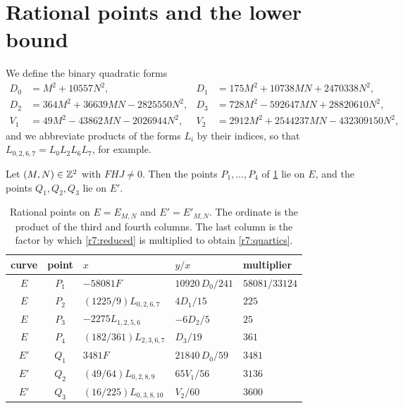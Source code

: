 \section{Rational points and the lower bound}\label{sec:r7-points}

We define the binary quadratic forms
\begin{equation}\label{r7:quadratics}
\begin{aligned}
 D_0&=M^2+10557N^2, & D_1&=175M^2+10738MN+2470338N^2,\\
 D_2&=364M^2+36639MN-2825550N^2, & D_3&=728M^2-592647MN+28820610N^2,\\
 V_1&=49M^2-43862MN-2026944N^2, & V_2&=2912M^2+2544237MN-432309150N^2,
\end{aligned}
\end{equation}
and we abbreviate products of the forms $L_i$ by their indices, so that
$L_{0,2,6,7}=L_0L_2L_6L_7$, for example.

\begin{lemma}\label{lem:r7-points}
Let $(M,N)\in\mathbb Z^2$ with $FHJ\ne0$. Then the points $P_1,\dots,P_4$ of
\cref{tab:r7-points} lie on $E$, and the points $Q_1,Q_2,Q_3$ lie on $E'$.
\end{lemma}

\begin{table}[htbp]
\centering
\caption{Rational points on $E=E_{M,N}$ and $E'=E'_{M,N}$. The ordinate is
the product of the third and fourth columns. The last column is the factor
by which \eqref{r7:reduced} is multiplied to obtain \eqref{r7:quartics}.}
\label{tab:r7-points}
\begin{tabular}{cclll}
\toprule
curve & point & $x$ & $y/x$ & multiplier\\
\midrule
$E$ & $P_1$ & $-58081F$ & $10920\,D_0/241$ & $58081/33124$\\
$E$ & $P_2$ & $(1225/9)L_{0,2,6,7}$ & $4D_1/15$ & $225$\\
$E$ & $P_3$ & $-2275L_{1,2,5,6}$ & $-6D_2/5$ & $25$\\
$E$ & $P_4$ & $(182/361)L_{2,3,6,7}$ & $D_3/19$ & $361$\\
\addlinespace
$E'$ & $Q_1$ & $3481F$ & $21840\,D_0/59$ & $3481$\\
$E'$ & $Q_2$ & $(49/64)L_{0,2,8,9}$ & $65V_1/56$ & $3136$\\
$E'$ & $Q_3$ & $(16/225)L_{0,3,8,10}$ & $V_2/60$ & $3600$\\
\bottomrule
\end{tabular}
\end{table}

